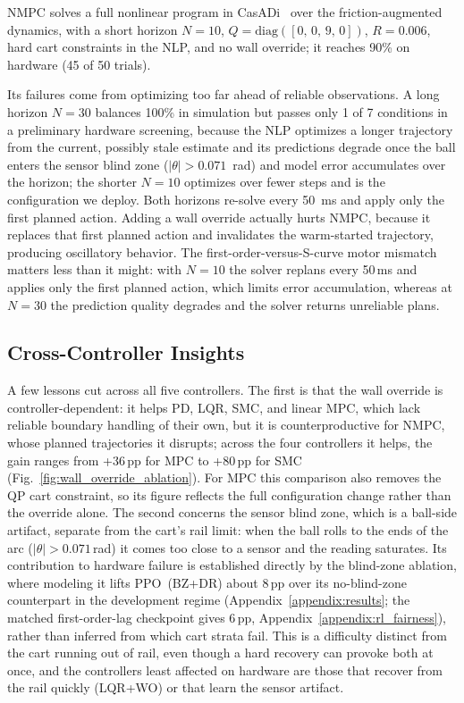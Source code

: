 NMPC solves a full nonlinear program in CasADi~\cite{casadi} over the
friction-augmented dynamics, with a short horizon $N=10$,
$Q = \text{diag}([0,\, 0,\, 9,\, 0])$, $R = 0.006$, hard cart constraints in
the NLP, and no wall override; it reaches 90\% on hardware (45 of 50 trials).

Its failures come from optimizing too far ahead of reliable observations. A
long horizon $N=30$ balances 100\% in simulation but passes only 1 of 7
conditions in a preliminary hardware screening, because the NLP optimizes a
longer trajectory from the current, possibly stale estimate and its
predictions degrade once the ball enters the sensor blind zone
($|\theta| > 0.071$~rad) and model error accumulates over the horizon; the
shorter $N=10$ optimizes over fewer steps and is the configuration we deploy.
Both horizons re-solve every 50~ms and apply only the first planned action.
Adding a wall override actually hurts NMPC, because it replaces that first
planned action and invalidates the warm-started trajectory, producing
oscillatory behavior. The first-order-versus-S-curve motor mismatch matters less than it
might: with $N=10$ the solver replans every 50\,ms and applies only the first
planned action, which limits error accumulation, whereas at $N=30$ the prediction quality
degrades and the solver returns unreliable plans.

\subsection{Cross-Controller Insights}

A few lessons cut across all five controllers. The first is that the wall
override is controller-dependent: it helps PD, LQR, SMC, and linear MPC, which
lack reliable boundary handling of their own, but it is counterproductive for
NMPC, whose planned trajectories it disrupts; across the four controllers it
helps, the gain ranges from +36\,pp for MPC to +80\,pp for SMC
(Fig.~\ref{fig:wall_override_ablation}). For MPC this comparison also removes
the QP cart constraint, so its figure reflects the full configuration change
rather than the override alone. The second concerns the sensor
blind zone, which is a ball-side artifact, separate from the cart's rail
limit: when the ball rolls to the ends of the arc ($|\theta| > 0.071$\,rad) it
comes too close to a sensor and the reading saturates. Its contribution to
hardware failure is established directly by the blind-zone ablation, where
modeling it lifts PPO~(BZ+DR) about 8\,pp over its no-blind-zone counterpart
in the development regime (Appendix~\ref{appendix:results}; the matched
first-order-lag checkpoint gives 6\,pp, Appendix~\ref{appendix:rl_fairness}),
rather than inferred from which cart strata fail.
This is a difficulty distinct from the cart running out of rail, even though a
hard recovery can provoke both at once, and the controllers least affected on
hardware are those that recover from the rail quickly (LQR+WO) or that learn
the sensor artifact.

